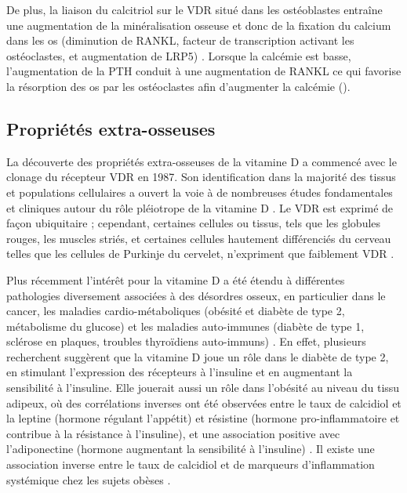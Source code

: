 \documentclass[
  a4paper,
  DIV=11,
  numbers=noendperiod,
  listof=totoc]{scrreprt}
\begin{document}
De plus, la liaison du calcitriol sur le VDR situé dans les ostéoblastes
entraîne une augmentation de la minéralisation osseuse et donc de la
fixation du calcium dans les os (diminution de RANKL, facteur de
transcription activant les ostéoclastes, et augmentation de LRP5)
\autocite{Carmeliet.2015}. Lorsque la calcémie est basse, l'augmentation
de la \ac{PTH} conduit à une augmentation de RANKL ce qui favorise la
résorption des os par les ostéoclastes afin d'augmenter la calcémie
().

\subsection{Propriétés
extra-osseuses}\label{propriuxe9tuxe9s-extra-osseuses}

La découverte des propriétés extra-osseuses de la vitamine D a commencé
avec le clonage du récepteur \ac{VDR} en 1987. Son identification dans
la majorité des tissus et populations cellulaires a ouvert la voie à de
nombreuses études fondamentales et cliniques autour du rôle pléiotrope
de la vitamine D \autocite{Rosen.2012}. Le \ac{VDR} est exprimé de façon
ubiquitaire ; cependant, certaines cellules ou tissus, tels que les
globules rouges, les muscles striés, et certaines cellules hautement
différenciés du cerveau telles que les cellules de Purkinje du cervelet,
n'expriment que faiblement \ac{VDR} \autocite{Bouillon.2008}.

Plus récemment l'intérêt pour la vitamine D a été étendu à différentes
pathologies diversement associées à des désordres osseux, en particulier
dans le cancer, les maladies cardio-métaboliques (obésité et diabète de
type 2, métabolisme du glucose) et les maladies auto-immunes (diabète de
type 1, sclérose en plaques, troubles thyroïdiens auto-immuns)
\autocite{Dankers.2017,Caprio.2017}. En effet, plusieurs recherchent
suggèrent que la vitamine D joue un rôle dans le diabète de type 2, en
stimulant l'expression des récepteurs à l'insuline et en augmentant la
sensibilité à l'insuline. Elle jouerait aussi un rôle dans l'obésité au
niveau du tissu adipeux, où des corrélations inverses ont été observées
entre le taux de calcidiol et la leptine (hormone régulant l'appétit) et
résistine (hormone pro-inflammatoire et contribue à la résistance à
l'insuline), et une association positive avec l'adiponectine (hormone
augmentant la sensibilité à l'insuline)
\autocite{Caprio.2017,Bellia.2013}. Il existe une association inverse
entre le taux de calcidiol et de marqueurs d'inflammation systémique
chez les sujets obèses \autocite{Bellia.2013}.
\end{document}
